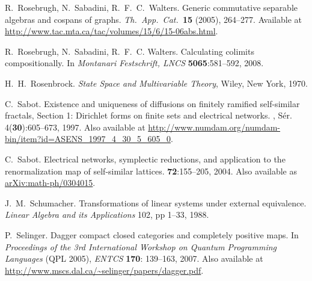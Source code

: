 \begin{thebibliography}{RSW00}
    R.\ Rosebrugh, N.\ Sabadini, R.\ F.\ C.\ Walters.
    \newblock Generic
    commutative separable algebras and cospans of graphs.
    \newblock \textsl{Th.\ App.\
    Cat.\ }\textbf{15} (2005), 264--277.
    \newblock Available at
    \href{http://www.tac.mta.ca/tac/volumes/15/6/15-06abs.html}{http://www.tac.mta.ca/tac/volumes/15/6/15-06abs.html}.

    R.\ Rosebrugh, N.\ Sabadini, R.\ F.\ C. Walters.
    \newblock Calculating
    colimits compositionally.
    \newblock In \emph{Montanari Festschrift, LNCS} {\bf 5065}:581--592, 2008.

    H.\ H.\ Rosenbrock.
    \newblock \emph{State Space and Multivariable Theory},
    Wiley, New York, 1970. 


    C.\ Sabot.
    \newblock Existence and uniqueness of diffusions on
    finitely ramified self-similar fractals, Section 1: Dirichlet forms on
    finite sets and electrical networks.
    , S\'er. 4({\bf 30}):605--673, 1997.
    \newblock Also available at
    \href{http://www.numdam.org/numdam-bin/item?id=ASENS_1997_4_30_5_605_0}{http://www.numdam.org/numdam-bin/item?id=ASENS\_1997\_4\_30\_5\_605\_0}.

    C.\ Sabot.
    \newblock Electrical networks, symplectic reductions, and
    application to the renormalization map of self-similar lattices.
     {\bf 72}:155--205, 2004.
    \newblock Also available as
    \href{http://arxiv.org/abs/math-ph/0304015}{arXiv:math-ph/0304015}.

    J.\ M.\ Schumacher.
    \newblock Transformations of linear systems under
    external equivalence.
    \newblock \emph{Linear Algebra and its Applications} 102,
    pp 1--33, 1988.


    P.\ Selinger.
    \newblock Dagger compact closed categories and completely
    positive maps.
    \newblock In {\sl Proceedings of the 3rd International Workshop on
    Quantum Programming Languages} (QPL 2005), {\sl ENTCS} {\bf 170}:
    139--163, 2007.
    \newblock Also available at
    \href{http://www.mscs.dal.ca/~selinger/papers/dagger.pdf}{http://www.mscs.dal.ca/\~{}selinger/papers/dagger.pdf}.


\end{thebibliography}
